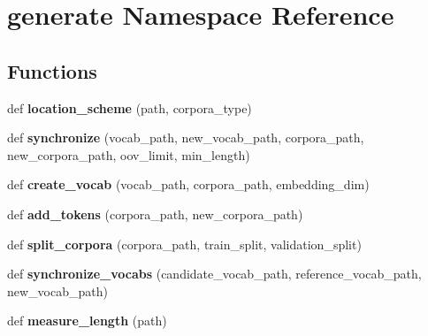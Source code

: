 \hypertarget{namespacegenerate}{}\section{generate Namespace Reference}
\label{namespacegenerate}
\subsection*{Functions}
\begin{DoxyCompactItemize}
\item 
def {\bfseries location\+\_\+scheme} (path, corpora\+\_\+type)\hypertarget{namespacegenerate_a4852d295e65058d89cd096eda91faec8}{}\label{namespacegenerate_a4852d295e65058d89cd096eda91faec8}

\item 
def {\bfseries synchronize} (vocab\+\_\+path, new\+\_\+vocab\+\_\+path, corpora\+\_\+path, new\+\_\+corpora\+\_\+path, oov\+\_\+limit, min\+\_\+length)\hypertarget{namespacegenerate_a38b7c0d8bb41d98a4ef66d53a495794c}{}\label{namespacegenerate_a38b7c0d8bb41d98a4ef66d53a495794c}

\item 
def {\bfseries create\+\_\+vocab} (vocab\+\_\+path, corpora\+\_\+path, embedding\+\_\+dim)\hypertarget{namespacegenerate_a7237b003f62b8f487eff3461442fcf56}{}\label{namespacegenerate_a7237b003f62b8f487eff3461442fcf56}

\item 
def {\bfseries add\+\_\+tokens} (corpora\+\_\+path, new\+\_\+corpora\+\_\+path)\hypertarget{namespacegenerate_aaebd35e2fac0ef0960c659223ce3580a}{}\label{namespacegenerate_aaebd35e2fac0ef0960c659223ce3580a}

\item 
def {\bfseries split\+\_\+corpora} (corpora\+\_\+path, train\+\_\+split, validation\+\_\+split)\hypertarget{namespacegenerate_a0f4f9b98626dc93fb945f1f994a66113}{}\label{namespacegenerate_a0f4f9b98626dc93fb945f1f994a66113}

\item 
def {\bfseries synchronize\+\_\+vocabs} (candidate\+\_\+vocab\+\_\+path, reference\+\_\+vocab\+\_\+path, new\+\_\+vocab\+\_\+path)\hypertarget{namespacegenerate_ad12c91b393ba1bec90681ac8656699e6}{}\label{namespacegenerate_ad12c91b393ba1bec90681ac8656699e6}

\item 
def {\bfseries measure\+\_\+length} (path)\hypertarget{namespacegenerate_ab65fbac89692766d23fa0f79b714e7ab}{}\label{namespacegenerate_ab65fbac89692766d23fa0f79b714e7ab}


\end{DoxyCompactItemize}
